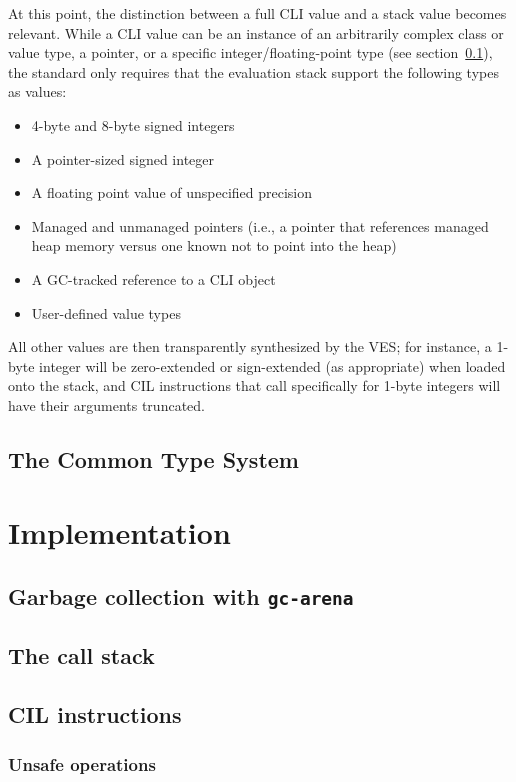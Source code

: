 At this point, the distinction between a full CLI value and a stack value becomes relevant.
While a CLI value can be an instance of an arbitrarily complex class or value type, a pointer, or a specific integer/floating-point type
(see section~\ref{sec:cts}),
the standard only requires that the evaluation stack support the following types as values:
\begin{itemize}
    \item 4-byte and 8-byte signed integers
    \item A pointer-sized signed integer
    \item A floating point value of unspecified precision
    \item Managed and unmanaged pointers (i.e., a pointer that references managed heap memory versus one known not to point into the heap)
    \item A GC-tracked reference to a CLI object
    \item User-defined value types
\end{itemize}
All other values are then transparently synthesized by the VES; for instance, a 1-byte integer will be zero-extended or sign-extended (as appropriate)
when loaded onto the stack, and CIL instructions that call specifically for 1-byte integers will have their arguments truncated.

\subsection{The Common Type System}\label{sec:cts}

\section{Implementation}

\subsection{Garbage collection with \texttt{gc-arena}}

\subsection{The call stack}

\subsection{CIL instructions}

\subsubsection{Unsafe operations}

